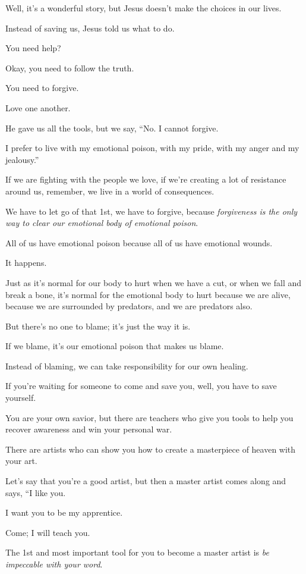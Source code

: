 \documentclass{article}
\numberwithin{equation}{section}
\begin{document}
Well, it's a wonderful story, but Jesus doesn't make the choices in our lives.

Instead of saving us, Jesus told us what to do.

You need help?

Okay, you need to follow the truth.

You need to forgive.

Love one another.

He gave us all the tools, but we say, ``No. I cannot forgive.

I prefer to live with my emotional poison, with my pride, with my anger and my jealousy.''

If we are fighting with the people we love, if we're creating a lot of resistance around us, remember, we live in a world of consequences.

We have to let go of that 1st, we have to forgive, because \textit{forgiveness is the only way to clear our emotional body of emotional poison}.

%
All of us have emotional poison because all of us have emotional wounds.

It happens.

Just as it's normal for our body to hurt when we have a cut, or when we fall and break a bone, it's normal for the emotional body to hurt because we are alive, because we are surrounded by predators, and we are predators also.

But there's no one to blame; it's just the way it is.

If we blame, it's our emotional poison that makes us blame.

Instead of blaming, we can take responsibility for our own healing.

%
If you're waiting for someone to come and save you, well, you have to save yourself.

You are your own savior, but there are teachers who give you tools to help you recover awareness and win your personal war.

There are artists who can show you how to create a masterpiece of heaven with your art.

%
Let's say that you're a good artist, but then a master artist comes along and says, ``I like you.

I want you to be my apprentice.

Come; I will teach you.

The 1st and most important tool for you to become a master artist is \textit{be impeccable with your word}.
\end{document}
